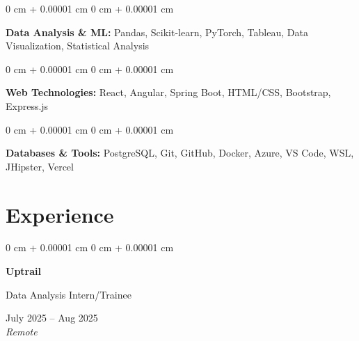 \documentclass[10pt, a4paper]{article}
\newenvironment{onecolentry}{
    \begin{adjustwidth}{
        0 cm + 0.00001 cm
    }{
        0 cm + 0.00001 cm
    }
}{
    \end{adjustwidth}
} %
\newenvironment{twocolentry}[2][]{
    \onecolentry
    \def\secondColumn{#2}
    \setcolumnwidth{\fill, 4.5 cm}
    \begin{paracol}{2}
}{
    \switchcolumn \raggedleft \secondColumn
    \end{paracol}
    \endonecolentry
} %
\begin{document}
    \vspace{0.2 cm}

    \begin{onecolentry}
        \textbf{Data Analysis \& ML:} Pandas, Scikit-learn, PyTorch, Tableau, Data Visualization, Statistical Analysis
    \end{onecolentry}

    \vspace{0.2 cm}

    \begin{onecolentry}
        \textbf{Web Technologies:} React, Angular, Spring Boot, HTML/CSS, Bootstrap, Express.js
    \end{onecolentry}

    \vspace{0.2 cm}

    \begin{onecolentry}
        \textbf{Databases \& Tools:} PostgreSQL, Git, GitHub, Docker, Azure, VS Code, WSL, JHipster, Vercel
    \end{onecolentry}

    \vspace{0.2 cm}


    \section{Experience}

    \begin{twocolentry}{
        July 2025 -- Aug 2025 \\
        \textit{Remote}
    }
        \textbf{Uptrail}
        
        Data Analysis Intern/Trainee
    \end{twocolentry}
\end{document}
